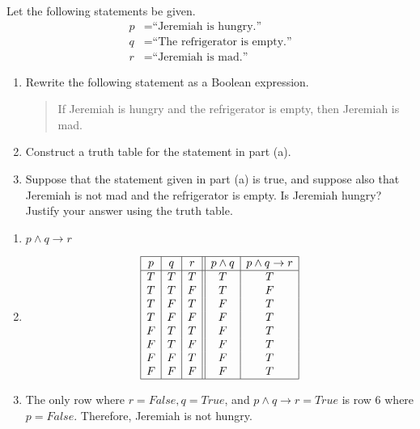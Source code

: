 \documentclass{article}
\theoremstyle{definition}
\begin{document}
\begin{question}
	Let the following statements be given.
		\begin{align*}
		p &= \text{``Jeremiah is hungry.''}\\
		q &= \text{``The refrigerator is empty.''}\\
		r &= \text{``Jeremiah is mad.''}
		\end{align*}
	\begin{enumerate}
		\item Rewrite the following statement as a Boolean expression.\\
			\begin{quote}
			If Jeremiah is hungry and the refrigerator is empty, then Jeremiah is mad.
			\end{quote}
		\item Construct a truth table for the statement in part (a).
		\item Suppose that the statement given in part (a) is true, and suppose also that Jeremiah is not mad and the refrigerator is empty. Is Jeremiah hungry? Justify your answer using the truth table.
	\end{enumerate}
\end{question}
\begin{solution}
	\begin{enumerate}
	\item $p\wedge q \to r$
	\item 
	\[\begin{array}{| c | c | c || c | c |}
	\hline
	p & q & r & p \wedge q & p \wedge q \to r\\
	\hline
		T & T & T & T & T\\
		T & T & F & T & F\\
		T & F & T & F & T\\
		T & F & F & F & T\\
		F & T & T & F & T\\
		F & T & F & F & T\\
		F & F & T & F & T\\
		F & F & F & F & T\\
	\hline
	\end{array}\]
	\item The only row where $r=False, q=True$, and $p \wedge q \to r=True$ is row 6 where $p=False$. Therefore, Jeremiah is not hungry.
	\end{enumerate}
\end{solution}
\end{document}
